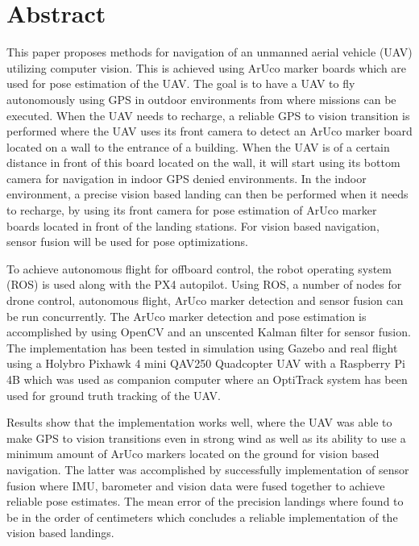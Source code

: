 \documentclass[../Head/report.tex]{subfiles}
\begin{document}
\thispagestyle{empty}
\section*{Abstract}

This paper proposes methods for navigation of an unmanned aerial vehicle (UAV) utilizing computer vision. This is achieved using ArUco marker boards which are used for pose estimation of the UAV. The goal is to have a UAV to fly autonomously using GPS in outdoor environments from where missions can be executed. When the UAV needs to recharge, a reliable GPS to vision transition is performed where the UAV uses its front camera to detect an ArUco marker board located on a wall to the entrance of a building. When the UAV is of a certain distance in front of this board located on the wall, it will start using its bottom camera for navigation in indoor GPS denied environments. In the indoor environment, a precise vision based landing can then be performed when it needs to recharge, by using its front camera for pose estimation of ArUco marker boards located in front of the landing stations. For vision based navigation, sensor fusion will be used for pose optimizations.

To achieve autonomous flight for offboard control, the robot operating system (ROS) is used along with the PX4 autopilot. Using ROS, a number of nodes for drone control, autonomous flight, ArUco marker detection and sensor fusion can be run concurrently. The ArUco marker detection and pose estimation is accomplished by using OpenCV and an unscented Kalman filter for sensor fusion. The implementation has been tested in simulation using Gazebo and real flight using a Holybro Pixhawk 4 mini QAV250 Quadcopter UAV with a Raspberry Pi 4B which was used as companion computer where an OptiTrack system has been used for ground truth tracking of the UAV.

Results show that the implementation works well, where the UAV was able to make GPS to vision transitions even in strong wind as well as its ability to use a minimum amount of ArUco markers located on the ground for vision based navigation. The latter was accomplished by successfully implementation of sensor fusion where IMU, barometer and vision data were fused together to achieve reliable pose estimates. The mean error of the precision landings where found to be in the order of centimeters which concludes a reliable implementation of the vision based landings.     
\end{document}
